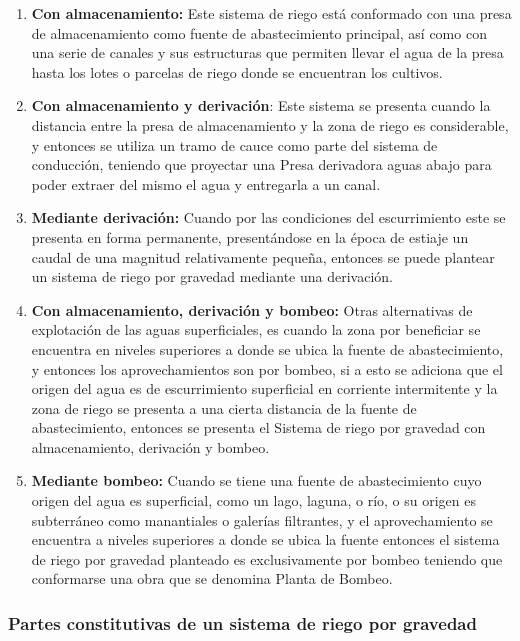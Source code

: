 \begin{enumerate}
	\item \textbf{Con almacenamiento:} Este sistema de riego está conformado con una presa de almacenamiento como
	      fuente de abastecimiento principal, así como con una serie de canales y sus
	      estructuras que permiten llevar el agua de la presa hasta los lotes o parcelas de riego
	      donde se encuentran los cultivos.
	\item \textbf{Con almacenamiento y derivación}: Este sistema se presenta cuando la distancia entre la presa de almacenamiento
	      y la zona de riego es considerable, y entonces se utiliza un tramo de cauce como parte
	      del sistema de conducción, teniendo que proyectar una Presa derivadora aguas abajo
	      para poder extraer del mismo el agua y entregarla a un canal.
	\item \textbf{Mediante derivación:} Cuando por las condiciones del escurrimiento este se presenta en forma
	      permanente, presentándose en la época de estiaje un caudal de una magnitud
	      relativamente pequeña, entonces se puede plantear un sistema de riego por gravedad
	      mediante una derivación.
	\item \textbf{Con almacenamiento, derivación y bombeo:} Otras alternativas de explotación de las aguas superficiales, es cuando la zona
	      por beneficiar se encuentra en niveles superiores a donde se ubica la fuente de
	      abastecimiento, y entonces los aprovechamientos son por bombeo, si a esto se
	      adiciona que el origen del agua es de escurrimiento superficial en corriente intermitente
	      y la zona de riego se presenta a una cierta distancia de la fuente de abastecimiento,
	      entonces se presenta el Sistema de riego por gravedad con almacenamiento,
	      derivación y bombeo.
	\item \textbf{Mediante bombeo:} Cuando se tiene una fuente de abastecimiento cuyo origen del agua es
	      superficial, como un lago, laguna, o río, o su origen es subterráneo como manantiales
	      o galerías filtrantes, y el aprovechamiento se encuentra a niveles superiores a donde se
	      ubica la fuente entonces el sistema de riego por gravedad planteado es exclusivamente
	      por bombeo teniendo que conformarse una obra que se denomina Planta de Bombeo.
\end{enumerate}

\subsubsection{Partes constitutivas de un sistema de riego por gravedad}

